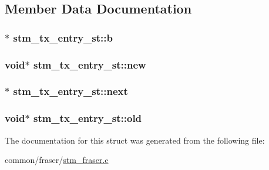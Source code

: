 \subsection{Member Data Documentation}
\hypertarget{structstm__tx__entry__st_a3d7517a664b7608a13c9634475cf1d73}{
\subsubsection[{b}]{$\ast$ stm\-\_\-tx\-\_\-entry\-\_\-st\-::b}}\label{structstm__tx__entry__st_a3d7517a664b7608a13c9634475cf1d73}
\hypertarget{structstm__tx__entry__st_a0c24c492ae7ecdb9c59014101db84a59}{
\subsubsection[{new}]{\setlength{\rightskip}{0pt plus 5cm}void$\ast$ stm\-\_\-tx\-\_\-entry\-\_\-st\-::new}}\label{structstm__tx__entry__st_a0c24c492ae7ecdb9c59014101db84a59}
\hypertarget{structstm__tx__entry__st_a891a5d83edca0b047a26a958795bf149}{
\subsubsection[{next}]{$\ast$ stm\-\_\-tx\-\_\-entry\-\_\-st\-::next}}\label{structstm__tx__entry__st_a891a5d83edca0b047a26a958795bf149}
\hypertarget{structstm__tx__entry__st_af9269be64413d5abdf51d0a6953f2fb0}{
\subsubsection[{old}]{\setlength{\rightskip}{0pt plus 5cm}void$\ast$ stm\-\_\-tx\-\_\-entry\-\_\-st\-::old}}\label{structstm__tx__entry__st_af9269be64413d5abdf51d0a6953f2fb0}


The documentation for this struct was generated from the following file\-:\begin{DoxyCompactItemize}
\item 
common/fraser/\hyperlink{stm__fraser_8c}{stm\-\_\-fraser.\-c}\end{DoxyCompactItemize}
